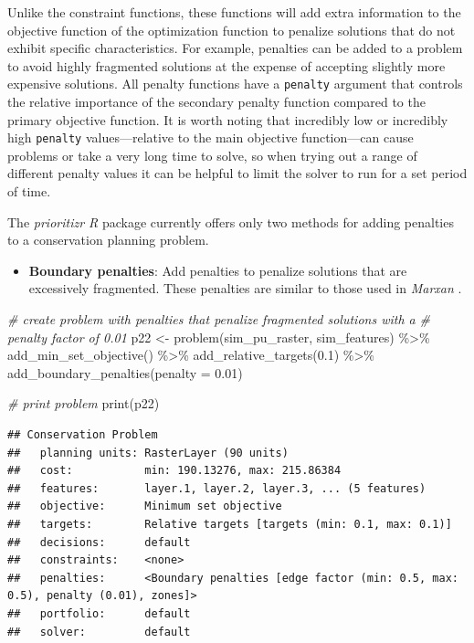 \documentclass[
  12pt,
]{book}
\newenvironment{Shaded}{\begin{snugshade}}{\end{snugshade}}
\newcommand{\AttributeTok}[1]{\textcolor[rgb]{0.77,0.63,0.00}{#1}}
\newcommand{\CommentTok}[1]{\textcolor[rgb]{0.56,0.35,0.01}{\textit{#1}}}
\newcommand{\FloatTok}[1]{\textcolor[rgb]{0.00,0.00,0.81}{#1}}
\newcommand{\FunctionTok}[1]{\textcolor[rgb]{0.00,0.00,0.00}{#1}}
\newcommand{\NormalTok}[1]{#1}
\newcommand{\OtherTok}[1]{\textcolor[rgb]{0.56,0.35,0.01}{#1}}
\newcommand{\SpecialCharTok}[1]{\textcolor[rgb]{0.00,0.00,0.00}{#1}}
\providecommand{\tightlist}{%
  \setlength{\itemsep}{0pt}\setlength{\parskip}{0pt}}
\begin{document}
Unlike the constraint functions, these functions will add extra information to the objective function of the optimization function to penalize solutions that do not exhibit specific characteristics. For example, penalties can be added to a problem to avoid highly fragmented solutions at the expense of accepting slightly more expensive solutions. All penalty functions have a \texttt{penalty} argument that controls the relative importance of the secondary penalty function compared to the primary objective function. It is worth noting that incredibly low or incredibly high \texttt{penalty} values---relative to the main objective function---can cause problems or take a very long time to solve, so when trying out a range of different penalty values it can be helpful to limit the solver to run for a set period of time.

The \emph{prioritizr R} package currently offers only two methods for adding penalties to a conservation planning problem.

\begin{itemize}
\tightlist
\item
  \textbf{Boundary penalties}: Add penalties to penalize solutions that are excessively fragmented. These penalties are similar to those used in \emph{Marxan} \citep{r3, r1}.
\end{itemize}

\begin{Shaded}
\begin{Highlighting}[]
\CommentTok{\# create problem with penalties that penalize fragmented solutions with a}
\CommentTok{\# penalty factor of 0.01}
\NormalTok{p22 }\OtherTok{\textless{}{-}} \FunctionTok{problem}\NormalTok{(sim\_pu\_raster, sim\_features) }\SpecialCharTok{\%\textgreater{}\%}
       \FunctionTok{add\_min\_set\_objective}\NormalTok{() }\SpecialCharTok{\%\textgreater{}\%}
       \FunctionTok{add\_relative\_targets}\NormalTok{(}\FloatTok{0.1}\NormalTok{) }\SpecialCharTok{\%\textgreater{}\%}
       \FunctionTok{add\_boundary\_penalties}\NormalTok{(}\AttributeTok{penalty =} \FloatTok{0.01}\NormalTok{)}

\CommentTok{\# print problem}
\FunctionTok{print}\NormalTok{(p22)}
\end{Highlighting}
\end{Shaded}

\begin{verbatim}
## Conservation Problem
##   planning units: RasterLayer (90 units)
##   cost:           min: 190.13276, max: 215.86384
##   features:       layer.1, layer.2, layer.3, ... (5 features)
##   objective:      Minimum set objective 
##   targets:        Relative targets [targets (min: 0.1, max: 0.1)]
##   decisions:      default
##   constraints:    <none>
##   penalties:      <Boundary penalties [edge factor (min: 0.5, max: 0.5), penalty (0.01), zones]>
##   portfolio:      default
##   solver:         default
\end{verbatim}
\end{document}
